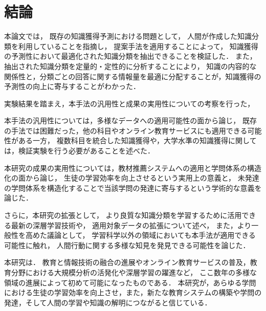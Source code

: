 \chapter{結論}
\label{chap:conlusion}
\fancyhf{}
\rhead{\thepage}
\cfoot{\thepage}


本論文では，
既存の知識獲得予測における問題として，
人間が作成した知識分類を利用していることを指摘し，
提案手法を適用することによって，
知識獲得の予測性において最適化された知識分類を抽出できることを検証した．
また，抽出された知識分類を定量的・定性的に分析することにより，
知識の内容的な関係性と，分類ごとの回答に関する情報量を最適に分配することが，知識獲得の予測性の向上に寄与することがわかった．
\vvspace

実験結果を踏まえ，本手法の汎用性と成果の実用性についての考察を行った，

本手法の汎用性については，多様なデータへの適用可能性の面から論じ，
既存の手法では困難だった，他の科目やオンライン教育サービスにも適用できる可能性がある一方，
複数科目を統合した知識獲得や，大学水準の知識獲得に関しては，検証実験を行う必要があることを述べた．

本研究の成果の実用性については，教材推薦システムへの適用と学問体系の構造化の面から論じ，
生徒の学習効率を向上させるという実用上の意義と，
未発達の学問体系を構造化することで当該学問の発達に寄与するという学術的な意義を論じた．

\vvspace

さらに，本研究の拡張として，
より良質な知識分類を学習するために活用できる最新の深層学習技術や，
適用対象データの拡張について述べ，
また，より一般性を高めた議論として，
学習科学以外の領域においても本手法が適用できる可能性に触れ，
人間行動に関する多様な知見を発見できる可能性を論じた．
\vvspace

本研究は．
教育と情報技術の融合の進展やオンライン教育サービスの普及，教育分野における大規模分析の活発化や深層学習の躍進など，
ここ数年の多様な領域の進展によって初めて可能になったものである．
本研究が，あらゆる学問における生徒の学習効率を向上させ，また，新たな教育システムの構築や学問の発達，そして人間の学習や知識の解明につながると信じている．
